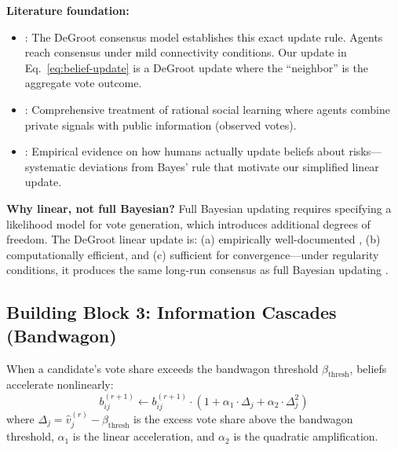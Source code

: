 \textbf{Literature foundation:}
\begin{itemize}[nosep]
\item \citet{degroot1974reaching}: The DeGroot consensus model establishes this exact
      update rule. Agents reach consensus under mild connectivity conditions.
      Our update in Eq.~\eqref{eq:belief-update} is a DeGroot update where the
      ``neighbor'' is the aggregate vote outcome.
\item \citet{chamley2004rational}: Comprehensive treatment of rational social learning
      where agents combine private signals with public information (observed votes).
\item \citet{ambuhl2021belief}: Empirical evidence on how humans actually update
      beliefs about risks---systematic deviations from Bayes' rule that motivate
      our simplified linear update.
\end{itemize}

\textbf{Why linear, not full Bayesian?}
Full Bayesian updating requires specifying a likelihood model for vote generation,
which introduces additional degrees of freedom. The DeGroot linear update is:
(a) empirically well-documented \citep{degroot1974reaching},
(b) computationally efficient, and
(c) sufficient for convergence---under regularity conditions, it produces the same
long-run consensus as full Bayesian updating \citep{chamley2004rational}.


\subsection{Building Block 3: Information Cascades (Bandwagon)}
\label{sec:bp-cascade}

\begin{tcolorbox}[colback=blue!3!white, colframe=blue!60!black, title=Axiom VTM-3: Bandwagon Acceleration]
When a candidate's vote share exceeds the bandwagon threshold $\beta_{\text{thresh}}$,
beliefs accelerate nonlinearly:
\begin{equation}
b_{ij}^{(r+1)} \leftarrow b_{ij}^{(r+1)} \cdot \left(1 + \alpha_1 \cdot \Delta_j + \alpha_2 \cdot \Delta_j^2 \right)
\label{eq:bandwagon}
\end{equation}
where $\Delta_j = \hat{v}_j^{(r)} - \beta_{\text{thresh}}$ is the excess vote share
above the bandwagon threshold, $\alpha_1$ is the linear acceleration, and $\alpha_2$
is the quadratic amplification.
\end{tcolorbox}

